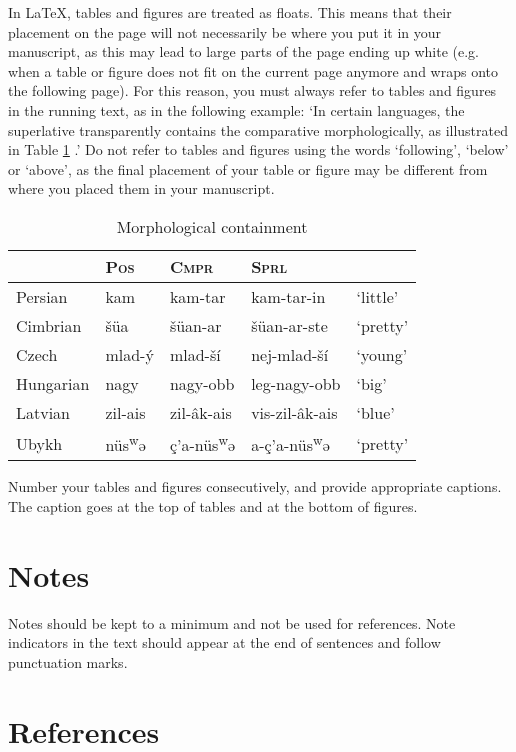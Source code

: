 \documentclass[times,linguex]{lsb}
\begin{document}
In \LaTeX, tables and figures are treated as floats. This means that their placement on the page will not necessarily be where you put it in your manuscript, as this may lead to large parts of the page ending up white (e.g. when a table or figure does not fit on the current page anymore and wraps onto the following page). For this reason, you must always refer to tables and figures in the running text, as in the following example: `In certain languages, the superlative transparently contains the comparative morphologically, as illustrated in Table \ref{tbl:table1} \citep[46]{Bobaljik2012}.' Do not refer to tables and figures using the words `following', `below' or `above', as the final placement of your table or figure may be different from where you placed them in your manuscript.

\begin{table}[h]
\centering
\caption{Morphological containment}	
\begin{tabular}{lllll}
 & \textsc{Pos} & \textsc{Cmpr} & \textsc{Sprl}\\
\hline 
Persian & kam & kam-tar & kam-tar-in & ‘little’\\
Cimbrian & šüa & šüan-ar & šüan-ar-ste & ‘pretty’ \\
Czech & mlad-ý & mlad-ší & nej-mlad-ší & ‘young’\\
Hungarian & nagy & nagy-obb & leg-nagy-obb & ‘big’\\
Latvian & zil-ais & zil-âk-ais & vis-zil-âk-ais & ‘blue’\\
Ubykh &  nüs\textsuperscript{w}ə & ç’a-nüs\textsuperscript{w}ə & a-ç’a-nüs\textsuperscript{w}ə & ‘pretty’ \\
\end{tabular}\label{tbl:table1}
\end{table}

Number your tables and figures consecutively, and provide  appropriate captions. The caption goes at the top of tables and at the bottom of figures.

\section{Notes}

Notes should be kept to a minimum and not be used for references. Note indicators in the text should appear at the end of sentences and follow punctuation marks.

\section{References}
\end{document}
